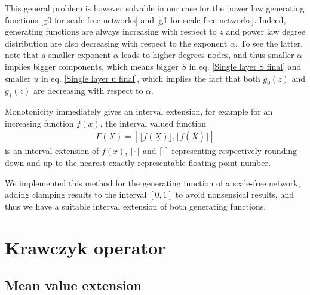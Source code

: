 \documentclass[
11pt, %
english, %
singlespacing, %
nolistspacing, %
liststotoc, %
headsepline, %
]{MastersDoctoralThesis} %
\begin{document}
This general problem is however solvable in our case for the power law generating functions \eqref{g0 for scale-free networks} and \eqref{g1 for scale-free networks}. Indeed, generating functions are always increasing with respect to $z$ and power law degree distribution are also decreasing with respect to the exponent $\alpha$. To see the latter, note that a smaller exponent $\alpha$ leads to higher degrees nodes, and thus smaller $\alpha$ implies bigger components, which means bigger $S$ in eq. \eqref{Single layer S final} and smaller $u$ in eq. \eqref{Single layer u final}, which implies the fact that both $g_0(z)$ and $g_1(z)$ are decreasing with respect to $\alpha$.

Monotonicity immediately gives an interval extension, for example for an increasing function $f(x)$, the interval valued function
\begin{align}
	F(X) = \left[\lfloor f(\underline{X}) \rfloor, \lceil f(\overline{X}) \rceil \right]
\end{align}
is an interval extension of $f(x)$, $\lfloor \cdot \rfloor$ and $\lceil \cdot \rceil$ representing respectively rounding down and up to the nearest exactly representable floating point number.

We implemented this method for the generating function of a scale-free network, adding clamping results to the interval $[0, 1]$ to avoid nonsensical results, and thus we have a suitable interval extension of both generating functions.

\chapter{Krawczyk operator}
\label{Appendix: Krawczyk operator}

\section{Mean value extension}
\end{document}
